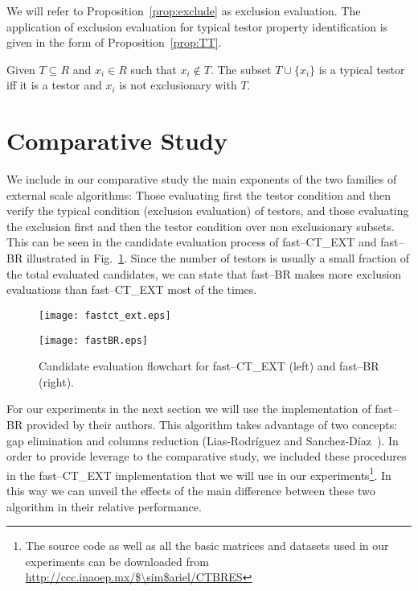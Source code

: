 \documentclass[citeauthoryear]{llncs}
\begin{document}
	We will refer to Proposition~\ref{prop:exclude} as exclusion evaluation. The application of exclusion evaluation for typical testor property identification is given in the form of Proposition~\ref{prop:TT}.
	
	\begin{proposition}\label{prop:TT} 
			Given $T \subseteq R$ and $x_i \in R$ such that $x_i \notin T$. The subset $T \cup \lbrace x_i\rbrace$ is a typical testor iff it is a testor and $x_i$ is not exclusionary with $T$.
	\end{proposition}
		
%
\section{Comparative Study}
%
	We include in our comparative study the main exponents of the two families of external scale algorithms: Those evaluating first the testor condition and then verify the typical condition (exclusion evaluation) of testors, and those evaluating the exclusion first and then the testor condition over non exclusionary subsets. This can be seen in the candidate evaluation process of fast--CT\_EXT and fast--BR illustrated in Fig.~\ref{fig:candeval}. Since the number of testors is usually a small fraction of the total evaluated candidates, we can state that fast--BR makes more exclusion evaluations than fast--CT\_EXT most of the times.
	
	\begin{figure}[htb]
	    \centering
	    \begin{minipage}{.5\textwidth}
	        \centering
	        \texttt{[image: fastct\_ext.eps]}
	    \end{minipage}%
	    \begin{minipage}{0.5\textwidth}
	        \centering
	        \texttt{[image: fastBR.eps]}	        
	    \end{minipage}
		\caption{Candidate evaluation flowchart for fast--CT\_EXT (left) and fast--BR (right).}
		\label{fig:candeval}
	\end{figure}
		
	For our experiments in the next section we will use the implementation of fast--BR provided by their authors. This algorithm takes advantage of two concepts: gap elimination and columns reduction (Lias-Rodr\'iguez and Sanchez-D\'iaz~\cite{Lias2013}). In order to provide leverage to the comparative study, we included these procedures in the fast--CT\_EXT implementation that we will use in our experiments\footnote{The source code as well as all the basic matrices and datasets used in our experiments can be downloaded from \url{http://ccc.inaoep.mx/$\sim$ariel/CTBRES}}. In this way we can unveil the effects of the main difference between these two algorithm in their relative performance.
	
\end{document}
